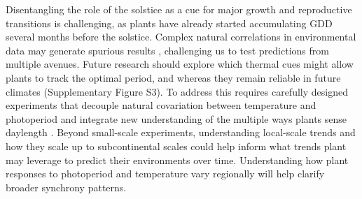 \documentclass[11pt,letter]{article}
\begin{document}
Disentangling the role of the solstice as a cue for major growth and reproductive transitions is challenging, as plants have already started accumulating GDD several months before the solstice.
Complex natural correlations in environmental data may generate spurious results \citep[e.g.][]{Gao2024}, challenging us to test predictions from multiple avenues. %
Future research should explore which thermal cues might allow plants to track the optimal period, and whereas they remain reliable in future climates (Supplementary Figure S3).
To address this requires carefully designed experiments that decouple natural covariation between temperature and photoperiod  \citep{Buonaiuto2023} and integrate new understanding of the multiple ways plants sense daylength \citep{wang2024plants}.  
Beyond small-scale experiments, understanding local-scale trends and how they scale up to subcontinental scales could help inform what trends plant may leverage to predict their environments over time. Understanding how plant responses to photoperiod and temperature vary regionally will help clarify broader synchrony patterns.
\end{document}
